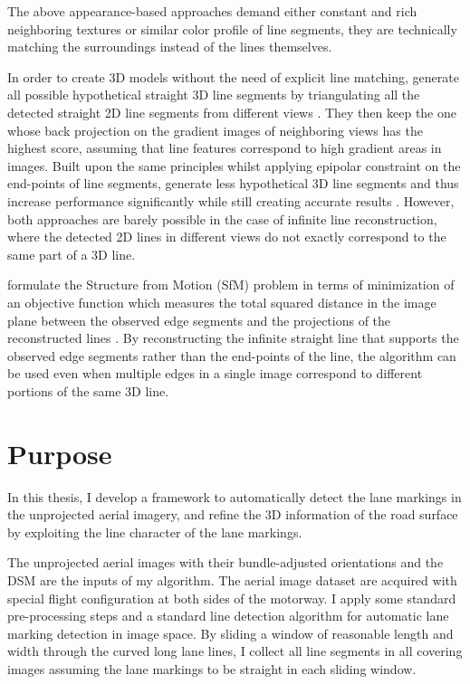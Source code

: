 The above appearance-based approaches demand either constant and rich neighboring textures or similar color profile of line segments, they are technically matching the surroundings instead of the lines themselves.

In order to create 3D models without the need of explicit line matching, \citeauthor{JainJun2010} generate all possible hypothetical straight 3D line segments by triangulating all the detected straight 2D line segments from different views \cite{JainJun2010}. They then keep the one whose back projection on the gradient images of neighboring views has the highest score, assuming that line features correspond to high gradient areas in images. Built upon the same principles whilst applying epipolar constraint on the end-points of line segments, \citeauthor{HoferFeb2013} generate less hypothetical 3D line segments and thus increase performance significantly while still creating accurate results \cite{HoferFeb2013}. However, both approaches are barely possible in the case of infinite line reconstruction, where the detected 2D lines in different views do not exactly correspond to the same part of a 3D line.

\citeauthor{TaylorNov1995} formulate the Structure from Motion (SfM) problem in terms of minimization of an objective function which measures the total squared distance in the image plane between the observed edge segments and the projections of the reconstructed lines \cite{TaylorNov1995}. By reconstructing the infinite straight line that supports the observed edge segments rather than the end-points of the line, the algorithm can be used even when multiple edges in a single image correspond to different portions of the same 3D line.

\section{Purpose}

In this thesis, I develop a framework to automatically detect the lane markings in the unprojected aerial imagery, and refine the 3D information of the road surface by exploiting the line character of the lane markings. 

The unprojected aerial images with their bundle-adjusted orientations and the DSM are the inputs of my algorithm. The aerial image dataset are acquired with special flight configuration at both sides of the motorway. I apply some standard pre-processing steps and a standard line detection algorithm for automatic lane marking detection in image space. By sliding a window of reasonable length and width through the curved long lane lines, I collect all line segments in all covering images assuming the lane markings to be straight in each sliding window.

